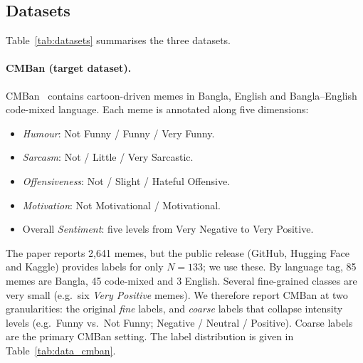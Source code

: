 \subsection{Datasets}
\label{sec:method:data}

Table~\ref{tab:datasets} summarises the three datasets.

\paragraph{CMBan (target dataset).}
CMBan~\cite{cmban2025} contains cartoon-driven memes in Bangla, English and Bangla--English code-mixed language.
Each meme is annotated along five dimensions:
\begin{itemize}
  \item \textit{Humour}: Not Funny / Funny / Very Funny.
  \item \textit{Sarcasm}: Not / Little / Very Sarcastic.
  \item \textit{Offensiveness}: Not / Slight / Hateful Offensive.
  \item \textit{Motivation}: Not Motivational / Motivational.
  \item Overall \textit{Sentiment}: five levels from Very Negative to Very Positive.
\end{itemize}
The paper reports 2{,}641 memes, but the public release (GitHub, Hugging Face and Kaggle) provides labels for only
$N=133$; we use these. By language tag, 85 memes are Bangla, 45 code-mixed and 3 English. Several fine-grained
classes are very small (e.g.\ six \textit{Very Positive} memes). We therefore report CMBan at two granularities: the
original \emph{fine} labels, and \emph{coarse} labels that collapse intensity levels (e.g.\ Funny vs.\ Not Funny;
Negative / Neutral / Positive). Coarse labels are the primary CMBan setting. The label distribution is given in
Table~\ref{tab:data_cmban}.

